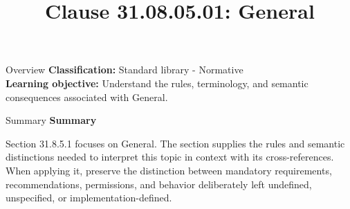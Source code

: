 \documentclass[10pt,letterpaper]{article}
\title{Clause 31.08.05.01: General}
\author{}
\date{}
\begin{document}
\maketitle
\begin{CornellOverviewBox}{Overview}
\textbf{Classification:} Standard library - Normative\\[2pt]
\textbf{Learning objective:} Understand the rules, terminology, and semantic consequences associated with General.
\end{CornellOverviewBox}\begin{CornellSummaryBox}{Summary}
{\sffamily\bfseries\color{Accent} Summary}\par\vspace{3pt}Section 31.8.5.1 focuses on General. The section supplies the rules and semantic distinctions needed to interpret this topic in context with its cross-references. When applying it, preserve the distinction between mandatory requirements, recommendations, permissions, and behavior deliberately left undefined, unspecified, or implementation-defined.
\end{CornellSummaryBox}
\end{document}
